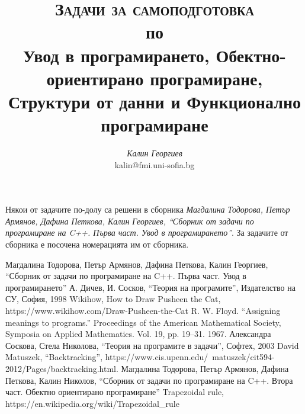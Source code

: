 \documentclass[12pt,a4paper]{book}
\author{\textit{Калин Георгиев}\\
\small{kalin@fmi.uni-sofia.bg}}
\title{\textsc{Задачи за самоподготовка} \\
по \\
Увод в програмирането, Обектно-ориентирано програмиране, Структури от данни и Функционално програмиране}
\begin{document}
\maketitle

\tableofcontents

\pagebreak

\small{Някои от задачите по-долу са решени в сборника \cite{sbornik}\textit{Магдалина Тодорова, Петър Армянов, Дафина Петкова, Калин Георгиев, ``Сборник от задачи по програмиране на C++. Първа част. Увод в програмирането''}. За задачите от сборника е посочена номерацията им от сборника.}

\pagebreak



\pagebreak 



\pagebreak 



\pagebreak



\pagebreak



\pagebreak

\begin{thebibliography}{99}

	Магдалина Тодорова, Петър Армянов, Дафина Петкова, Калин Георгиев, ``Сборник от задачи по програмиране на C++. Първа част. Увод в програмирането''
 А. Дичев, И. Сосков, ``Теория на програмите'', Издателство на СУ, София, 1998
 Wikihow, How to Draw Pusheen the Cat, https://www.wikihow.com/Draw-Pusheen-the-Cat
 R. W. Floyd. ``Assigning meanings to programs.'' Proceedings of the American Mathematical Society, Symposia on Applied Mathematics. Vol. 19, pp. 19–31. 1967.
	Александра Соскова, Стела Николова, ``Теория на програмите в задачи'', Софтех, 2003
	David Matuszek, ``Backtracking'', https://www.cis.upenn.edu/~matuszek/cit594-2012/Pages/backtracking.html.
 Магдалина Тодорова, Петър Армянов, Дафина Петкова, Калин Николов, ``Сборник от задачи по програмиране на C++. Втора част. Обектно ориентирано програмиране''
 Trapezoidal rule, https://en.wikipedia.org/wiki/Trapezoidal\_rule

\end{thebibliography}
\end{document}

